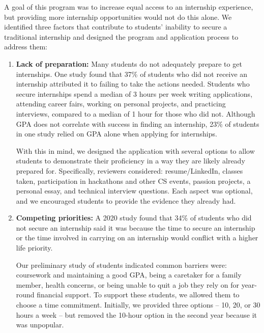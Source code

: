 A goal of this program was to increase equal access to an internship experience, but providing more internship opportunities would not do this alone. We identified three factors that contribute to students’ inability to secure a traditional internship and designed the program and application process to address them:

\begin{enumerate}
    \item \textbf{Lack of preparation:}
    Many students do not adequately prepare to get internships. One study found that 37\% of students who did not receive an internship attributed it to failing to take the actions needed. \cite{kapoorBarriersSecuringIndustry2020} Students who secure internships spend a median of 3 hours per week writing applications, attending career fairs, working on personal projects, and practicing interviews, compared to a median of 1 hour for those who did not. \cite{kapoorExploringParticipationCS2020} Although GPA does not correlate with success in finding an internship, \cite{gaultUndergraduateBusinessInternships2000} 23\% of students in one study relied on GPA alone when applying for internships. \cite{kapoorExploringParticipationCS2020}

    With this in mind, we designed the application with several options to allow students to demonstrate their proficiency in a way they are likely already prepared for. Specifically, reviewers considered: resume/LinkedIn, classes taken, participation in hackathons and other CS events, passion projects, a personal essay, and technical interview questions. Each aspect was optional, and we encouraged students to provide the evidence they already had.

    \item \textbf{Competing priorities:}
    A 2020 study found that 34\% of students who did not secure an internship said it was because the time to secure an internship or the time involved in carrying on an internship would conflict with a higher life priority. \cite{kapoorBarriersSecuringIndustry2020}
    
    Our preliminary study of students indicated common barriers were: coursework and maintaining a good GPA, being a caretaker for a family member, health concerns, or being unable to quit a job they rely on for year-round financial support. To support these students, we allowed them to choose a time commitment. Initially, we provided three options – 10, 20, or 30 hours a week – but removed the 10-hour option in the second year because it was unpopular.


\end{enumerate}
